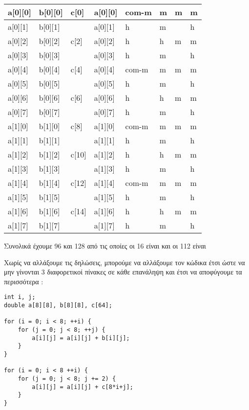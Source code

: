 \documentclass[10pt]{assignment}
\begin{document}
\begin{center}
\begin{tabularx}{\textwidth}{|Z|Z|Z|Z|Y|Y|Y|Y|}
\hline
a[0][0] & b[0][0] & c[0] & a[0][0] & com-m & m & m & m \\
\hline
a[0][1] & b[0][1] &      & a[0][1] & h & m & & h \\
\hline
a[0][2] & b[0][2] & c[2] & a[0][2] & h & h & m & m \\
\hline
a[0][3] & b[0][3] &      & a[0][3] & h & m & & h \\
\hline
a[0][4] & b[0][4] & c[4] & a[0][4] & com-m & m & m & m \\
\hline
a[0][5] & b[0][5] &      & a[0][5] & h & m & & h \\
\hline
a[0][6] & b[0][6] & c[6] & a[0][6] & h & h & m & m \\
\hline
a[0][7] & b[0][7] &      & a[0][7] & h & m & & h \\
\hline
a[1][0] & b[1][0] & c[8] & a[1][0] & com-m & m & m & m \\
\hline
a[1][1] & b[1][1] &      & a[1][1] & h & m & & h \\
\hline
a[1][2] & b[1][2] & c[10] & a[1][2] & h & h & m & m \\
\hline
a[1][3] & b[1][3] &       & a[1][3] & h & m & & h \\
\hline
a[1][4] & b[1][4] & c[12] & a[1][4] & com-m & m & m & m \\
\hline
a[1][5] & b[1][5] &       & a[1][5] & h & m & & h \\
\hline
a[1][6] & b[1][6] & c[14] & a[1][6] & h & h & m & m \\
\hline
a[1][7] & b[1][7] &       & a[1][7] & h & m & & h \\
\hline
\end{tabularx}
\end{center}
\vspace{4pt}

Συνολικά έχουμε 96  και 128  από τις οποίες οι 16 είναι  και οι 112 είναι 

Χωρίς να αλλάξουμε τις δηλώσεις, μπορούμε να αλλάξουμε τον κώδικα έτσι ώστε να μην γίνονται  3 διαφορετικοί πίνακες σε κάθε επανάληψη και έτσι να αποφύγουμε τα περισσότερα :

\begin{center}
\begin{verbatim}
int i, j;
double a[8][8], b[8][8], c[64];

for (i = 0; i < 8; ++i) {
    for (j = 0; j < 8; ++j) {
        a[i][j] = a[i][j] + b[i][j];
    }
}

for (i = 0; i < 8 ++i) {
    for (j = 0; j < 8; j += 2) {
        a[i][j] = a[i][j] + c[8*i+j];
    }
}
\end{verbatim}
\end{center}
\end{document}
